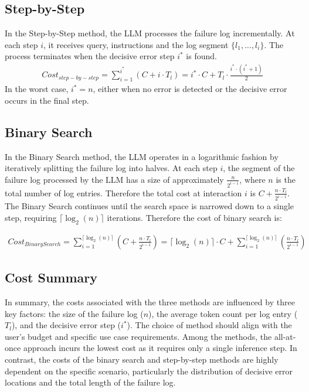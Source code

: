 \subsection{Step-by-Step}
In the Step-by-Step method, the LLM processes the failure log incrementally. At each step $i$, it receives query, instructions and the log segment $\{l_{1}, ..., l_{i}\}$. The process terminates when the decisive error step $i^{*}$ is found. 
\begin{align}
    Cost_{step-by-step} = \sum_{i=1}^{i^{*}}(C + i \cdot T_{l}) = i^{*} \cdot C + T_{l} \cdot \frac{i^{*} \cdot (i^{*}+1)}{2}
\end{align}
In the worst case, $i^{*} = n$, either when no error is detected or the decisive error occurs in the final step.

\subsection{Binary Search}
In the Binary Search method, the LLM operates in a logarithmic fashion by iteratively splitting the failure log into halves. 
At each step $i$, the segment of the failure log processed by the LLM has a size of approximately $\frac{n}{2^{i-1}}$, where $n$ is the total number of log entries. Therefore the total cost at interaction $i$ is $C + \frac{n\cdot T_{l}}{2^{i-1}}$. 
The Binary Search continues until the search space is narrowed down to a single step, requiring $\lceil \log_2(n) \rceil$ iterations. Therefore the cost of binary search is:

\begin{align}
    Cost_{Binary Search} = \sum_{i=1}^{\lceil \log_2(n) \rceil} (C + \frac{n\cdot T_{l}}{2^{i-1}}) = \lceil \log_2(n) \rceil\cdot C + \sum_{i=1}^{\lceil \log_2(n) \rceil}(\frac{n\cdot T_{l}}{2^{i-1}})
\end{align}

\subsection{Cost Summary}

In summary, the costs associated with the three methods are influenced by three key factors: the size of the failure log ($n$), the average token count per log entry ($T_{l}$), and the decisive error step ($i^{*}$). The choice of method should align with the user's budget and specific use case requirements.
Among the methods, the all-at-once approach incurs the lowest cost as it requires only a single inference step. In contrast, the costs of the binary search and step-by-step methods are highly dependent on the specific scenario, particularly the distribution of decisive error locations and the total length of the failure log.

